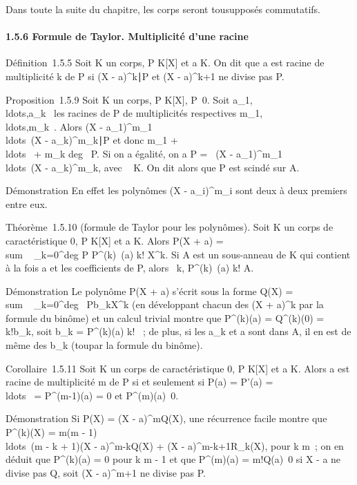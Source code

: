 \documentclass[]{article}
\begin{document}
Dans toute la suite du chapitre, les corps seront tou\jmathours supposés
commutatifs.

\paragraph{1.5.6 Formule de Taylor. Multiplicité d'une racine}

Définition~1.5.5 Soit K un corps, P \in K{[}X{]} et a \in K. On dit que a
est racine de multiplicité k de P si (X -
a)^k∣P et (X - a)^k+1 ne
divise pas P.

Proposition~1.5.9 Soit K un corps, P \in K{[}X{]},
P\neq~0. Soit
a\_1,\\ldots,a\_k~
les racines de P de multiplicités respectives
m\_1,\\ldots,m\_k~.
Alors (X -
a\_1)^m\_1\\ldots~(X
- a\_k)^m\_k∣P et
donc m\_1 +
\\ldots~ +
m\_k \leq deg~ P. Si on a égalité, on a P
= \lambda~(X -
a\_1)^m\_1\\ldots~(X
- a\_k)^m\_k, avec \lambda~ \in K. On dit alors que P
est scindé sur A.

Démonstration En effet les polynômes (X -
a\_i)^m\_i sont deux à deux premiers entre eux.

Théorème~1.5.10 (formule de Taylor pour les polynômes). Soit K un corps
de caractéristique 0, P \in K{[}X{]} et a \in K. Alors P(X + a)
= \\sum ~
\_k=0^deg P P^(k)~(a)
\over k! X^k. Si A est un sous-anneau de K
qui contient à la fois a et les coefficients de P, alors
\forall~k, P^(k)~(a) \over
k! \in A.

Démonstration Le polynôme P(X + a) s'écrit sous la forme Q(X)
= \\sum ~
\_k=0^deg~
Pb\_kX^k (en développant chacun des (X +
a)^k par la formule du binôme) et un calcul trivial montre que
P^(k)(a) = Q^(k)(0) = k!b\_k, soit
b\_k = P^(k)(a) \over k! ~; de
plus, si les a\_k et a sont dans A, il en est de même des
b\_k (tou\jmathours par la formule du binôme).

Corollaire~1.5.11 Soit K un corps de caractéristique 0, P \in K{[}X{]} et
a \in K. Alors a est racine de multiplicité m de P si et seulement si P(a)
= P'(a) = \\ldots~ =
P^(m-1)(a) = 0 et
P^(m)(a)\neq~0.

Démonstration Si P(X) = (X - a)^mQ(X), une récurrence facile
montre que P^(k)(X) = m(m -
1)\\ldots~(m - k +
1)(X - a)^m-kQ(X) + (X - a)^m-k+1R\_k(X),
pour k \leq m~; on en déduit que P^(k)(a) = 0 pour k \leq m - 1 et
que P^(m)(a) = m!Q(a)\neq~0 si X - a
ne divise pas Q, soit (X - a)^m+1 ne divise pas P.
\end{document}
